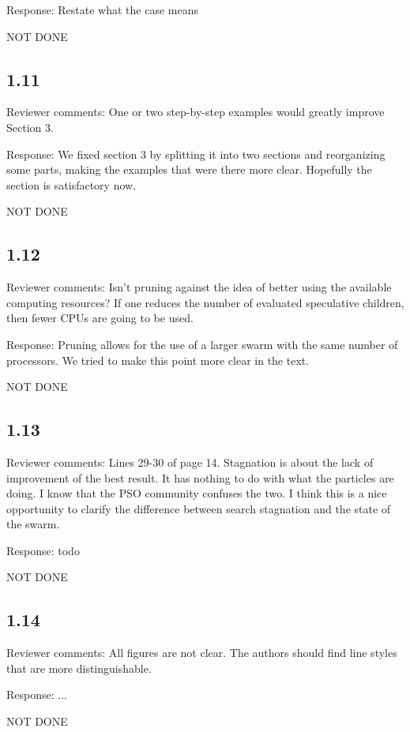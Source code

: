\documentclass[onecolumn, 12pt]{article}
\begin{document}
Response: Restate what the case means

NOT DONE

\subsection*{1.11}

Reviewer comments: One or two step-by-step examples would greatly improve
Section 3.

Response: We fixed section 3 by splitting it into two sections and reorganizing
some parts, making the examples that were there more clear.  Hopefully the
section is satisfactory now.

NOT DONE

\subsection*{1.12}

Reviewer comments: Isn't pruning against the idea of better using the available
computing resources? If one reduces the number of evaluated speculative
children, then fewer CPUs are going to be used.

Response: Pruning allows for the use of a larger swarm with the same number of
processors.  We tried to make this point more clear in the text.

NOT DONE

\subsection*{1.13}

Reviewer comments: Lines 29-30 of page 14. Stagnation is about the lack of
improvement of the best result. It has nothing to do with what the particles
are doing. I know that the PSO community confuses the two. I think this is a
nice opportunity to clarify the difference between search stagnation and the
state of the swarm.

Response: todo

NOT DONE

\subsection*{1.14}

Reviewer comments: All figures are not clear. The authors should find line
styles that are more distinguishable.

Response: ...

NOT DONE
\end{document}
